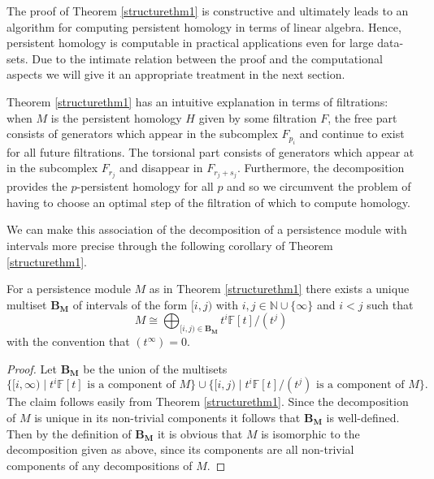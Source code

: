 The proof of Theorem \ref{structurethm1} is constructive and ultimately leads to an algorithm for computing persistent homology in terms of linear algebra. Hence, persistent homology is computable in practical applications even for large data-sets. Due to the intimate relation between the proof and the computational aspects we will give it an appropriate treatment in the next section.

Theorem \ref{structurethm1} has an intuitive explanation in terms of filtrations: when $M$ is the persistent homology $H$ given by some filtration $F$, the free part consists of generators which appear in the subcomplex $F_{p_{i}}$ and continue to exist for all future filtrations. The torsional part consists of generators which appear at in the subcomplex $F_{r_{j}}$ and disappear in  $F_{r_{j}+s_{j}}$. Furthermore, the decomposition provides the $p$-persistent homology for all $p$ and so we circumvent the problem of having to choose an optimal step of the filtration of which to compute homology.

We can make this association of the decomposition of a persistence module with intervals more precise through the following corollary of Theorem \ref{structurethm1}.

\begin{corollary}
  For a persistence module $M$ as in Theorem \ref{structurethm1} there exists a unique multiset $\mathbf{B_{M}}$ of intervals of the form $[i,j)$ with $i, j \in \mathbb{N} \cup \{\infty\}$ and $i<j$ such that
  \[M \cong \bigoplus_{[i,j) \in \mathbf{B_{M}}}t^{i}\mathbb{F}[t]/(t^{j}) \]
  with the convention that $(t^{\infty}) = 0$.

\end{corollary}
\begin{proof}
  Let $\mathbf{B_{M}}$ be the union of the multisets \[\{ [i,\infty) \mid t^{i}\mathbb{F}[t] \text{ is a component of }M \} \cup \{ [i,j) \mid t^{i} \mathbb{F}[t] / (t^{j}) \text{ is a component of }M\}.\]
The claim follows easily from Theorem \ref{structurethm1}.
Since the decomposition of $M$ is unique in its non-trivial components it follows that $\mathbf{B_{M}}$ is well-defined. Then by the definition of $\mathbf{B_{M}}$ it is obvious that $M$ is isomorphic to the decomposition given as above, since its components are all non-trivial components of any  decompositions of $M$.
\end{proof}

